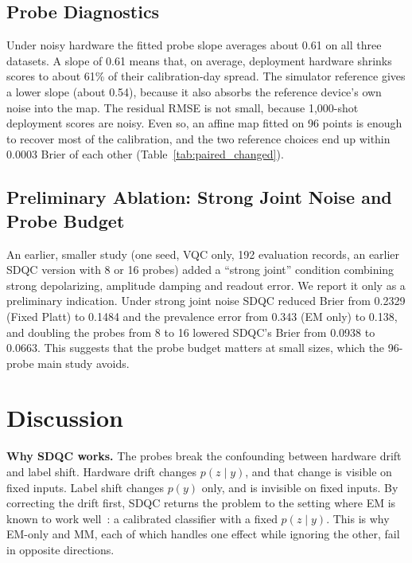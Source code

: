 \documentclass[conference]{IEEEtran}
\begin{document}
\subsection{Probe Diagnostics}

Under noisy hardware the fitted probe slope averages about 0.61 on all three datasets. A slope of 0.61 means that, on average, deployment hardware shrinks scores to about 61\% of their calibration-day spread. The simulator reference gives a lower slope (about 0.54), because it also absorbs the reference device's own noise into the map. The residual RMSE is not small, because 1,000-shot deployment scores are noisy. Even so, an affine map fitted on 96 points is enough to recover most of the calibration, and the two reference choices end up within 0.0003 Brier of each other (Table~\ref{tab:paired_changed}).

\subsection{Preliminary Ablation: Strong Joint Noise and Probe Budget}

An earlier, smaller study (one seed, VQC only, 192 evaluation records, an earlier SDQC version with 8 or 16 probes) added a ``strong joint'' condition combining strong depolarizing, amplitude damping and readout error. We report it only as a preliminary indication. Under strong joint noise SDQC reduced Brier from 0.2329 (Fixed Platt) to 0.1484 and the prevalence error from 0.343 (EM only) to 0.138, and doubling the probes from 8 to 16 lowered SDQC's Brier from 0.0938 to 0.0663. This suggests that the probe budget matters at small sizes, which the 96-probe main study avoids.

\section{Discussion}

\textbf{Why SDQC works.} The probes break the confounding between hardware drift and label shift. Hardware drift changes $p(z\mid y)$, and that change is visible on fixed inputs. Label shift changes $p(y)$ only, and is invisible on fixed inputs. By correcting the drift first, SDQC returns the problem to the setting where EM is known to work well~\cite{alexandari2020}: a calibrated classifier with a fixed $p(z\mid y)$. This is why EM-only and MM, each of which handles one effect while ignoring the other, fail in opposite directions.
\end{document}
